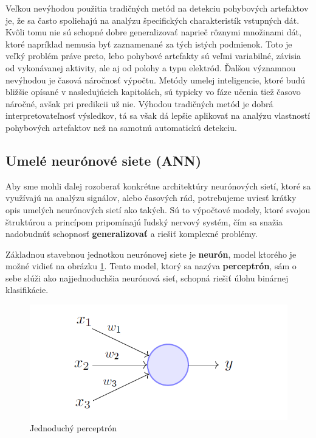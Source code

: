 Veľkou nevýhodou použitia tradičných metód na detekciu pohybových artefaktov je, že sa často spoliehajú na analýzu špecifických charakteristík vstupných dát. Kvôli tomu nie sú schopné dobre generalizovať naprieč rôznymi množinami dát, ktoré napríklad nemusia byť zaznamenané za tých istých podmienok. Toto je veľký problém práve preto, lebo pohybové artefakty sú veľmi variabilné, závisia od vykonávanej aktivity, ale aj od polohy a typu elektród. Ďalšou významnou nevýhodou je časová náročnosť výpočtu. Metódy umelej inteligencie, ktoré budú bližšie opísané v nasledujúcich kapitolách, sú typicky vo fáze učenia tiež časovo náročné, avšak pri predikcii už nie. Výhodou tradičných metód je dobrá interpretovateľnosť výsledkov, tá sa však dá lepšie aplikovať na analýzu vlastností pohybových artefaktov než na samotnú automatickú detekciu.

\subsection{Umelé neurónové siete (ANN)}

Aby sme mohli ďalej rozoberať konkrétne architektúry neurónových sietí, ktoré sa využívajú na analýzu signálov, alebo časových rád, potrebujeme uviesť krátky opis umelých neurónových sietí ako takých. Sú to výpočtové modely, ktoré svojou štruktúrou a princípom pripomínajú ľudský nervový systém, čím sa snažia nadobudnúť schopnosť \textbf{generalizovať} a riešiť komplexné problémy. 

Základnou stavebnou jednotkou neurónovej siete je \textbf{neurón}, model ktorého je možné vidieť na obrázku \ref{fig:perceptron}. Tento model, ktorý sa nazýva \textbf{perceptrón}, sám o sebe slúži ako najjednoduchšia neurónová sieť, schopná riešiť úlohu binárnej klasifikácie.\cite{Minsky1969-vq} 

\begin{figure}[H]
    \centering
    \includegraphics[scale=0.3]{img/perceptron.png}
    \caption{Jednoduchý perceptrón\cite{Minsky1969-vq}}
    \label{fig:perceptron}
\end{figure}

